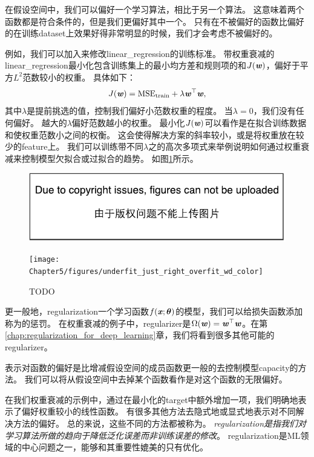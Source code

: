 在假设空间中，我们可以偏好一个学习算法，相比于另一个算法。
这意味着两个函数都是符合条件的，但是我们更偏好其中一个。
只有在不被偏好的函数比偏好的在训练\gls{dataset}上效果好得非常明显的时候，我们才会考虑不被偏好的。


例如，我们可以加入来修改\gls{linear_regression}的训练标准。
带权重衰减的\gls{linear_regression}最小化包含训练集上的最小均方差和规则项的和$J(\boldsymbol{\mathit{w}})$，偏好于平方$L^2$范数较小的权重。
具体如下：
\begin{equation}
    J(\boldsymbol{\mathit{w}}) = \text{MSE}_{\text{train}} + \lambda \boldsymbol{\mathit{w}}^\top \boldsymbol{\mathit{w}},
\end{equation}
其中$\lambda$是提前挑选的值，控制我们偏好小范数权重的程度。
当$\lambda =0$，我们没有任何偏好。
越大的$\lambda$偏好范数越小的权重。
最小化$J(\boldsymbol{\mathit{w}})$可以看作是在拟合训练数据和使权重范数小之间的权衡。
这会使得解决方案的斜率较小，或是将权重放在较少的\gls{feature}上。
我们可以训练带不同$\lambda$之的高次多项式来举例说明如何通过权重衰减来控制模型欠拟合或过拟合的趋势。
如图\ref{fig:chap5_underfit_just_right_overfit_wd_color}所示。

\begin{figure}[!htb]
\ifOpenSource
\centerline{\includegraphics{figure.pdf}}
\else
\centerline{\texttt{[image: Chapter5/figures/underfit\_just\_right\_overfit\_wd\_color]}}
\fi
\caption{TODO}
\label{fig:chap5_underfit_just_right_overfit_wd_color}
\end{figure}

更一般地，\gls{regularization}一个学习函数$f(\boldsymbol{\mathit{x}};\boldsymbol{\theta})$的模型，我们可以给损失函数添加称为的惩罚。
在权重衰减的例子中，\gls{regularizer}是$\Omega(\boldsymbol{\mathit{w}}) = \boldsymbol{\mathit{w}}^\top \boldsymbol{\mathit{w}}$。在第\ref{chap:regularization_for_deep_learning}章，我们将看到很多其他可能的\gls{regularizer}。


表示对函数的偏好是比增减假设空间的成员函数更一般的去控制模型\gls{capacity}的方法。
我们可以将从假设空间中去掉某个函数看作是对这个函数的无限偏好。

在我们权重衰减的示例中，通过在最小化的\gls{target}中额外增加一项，我们明确地表示了偏好权重较小的线性函数。
有很多其他方法去隐式地或显式地表示对不同解决方法的偏好。
总的来说，这些不同的方法都被称为。
\emph{\gls{regularization}是指我们对学习算法所做的趋向于降低泛化误差而非训练误差的修改}。
\gls{regularization}是\gls{ML}领域的中心问题之一，能够和其重要性媲美的只有优化。

